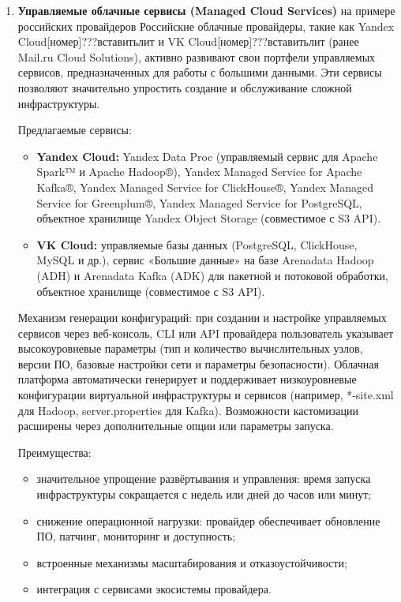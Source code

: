 \begin{enumerate}
	\item \textbf{Управляемые облачные сервисы (Managed Cloud Services)} на примере российских провайдеров
	      Российские облачные провайдеры, такие как Yandex Cloud[номер]???вставитьлит{} и VK Cloud[номер]???вставитьлит{} (ранее Mail.ru Cloud Solutions), активно развивают свои портфели управляемых сервисов, предназначенных для работы с большими данными. Эти сервисы позволяют значительно упростить создание и обслуживание сложной инфраструктуры.

	      Предлагаемые сервисы:
	      \begin{itemize}
		      \item \textbf{Yandex Cloud:} Yandex Data Proc (управляемый сервис для Apache Spark™ и Apache Hadoop®), Yandex Managed Service for Apache Kafka®, Yandex Managed Service for ClickHouse®, Yandex Managed Service for Greenplum®, Yandex Managed Service for PostgreSQL, объектное хранилище Yandex Object Storage (совместимое с S3 API).
		      \item \textbf{VK Cloud:} управляемые базы данных (PostgreSQL, ClickHouse, MySQL и др.), сервис «Большие данные» на базе Arenadata Hadoop (ADH) и Arenadata Kafka (ADK) для пакетной и потоковой обработки, объектное хранилище (совместимое с S3 API).
	      \end{itemize}

	      Механизм генерации конфигураций: при создании и настройке управляемых сервисов через веб-консоль, CLI или API провайдера пользователь указывает высокоуровневые параметры (тип и количество вычислительных узлов, версии ПО, базовые настройки сети и параметры безопасности). Облачная платформа автоматически генерирует и поддерживает низкоуровневые конфигурации виртуальной инфраструктуры и сервисов (например, *-site.xml для Hadoop, server.properties для Kafka). Возможности кастомизации расширены через дополнительные опции или параметры запуска.

	      Преимущества:
	      \begin{itemize}
		      \item значительное упрощение развёртывания и управления: время запуска инфраструктуры сокращается с недель или дней до часов или минут;
		      \item снижение операционной нагрузки: провайдер обеспечивает обновление ПО, патчинг, мониторинг и доступность;
		      \item встроенные механизмы масштабирования и отказоустойчивости;
		      \item интеграция с сервисами экосистемы провайдера.
	      \end{itemize}


\end{enumerate}
